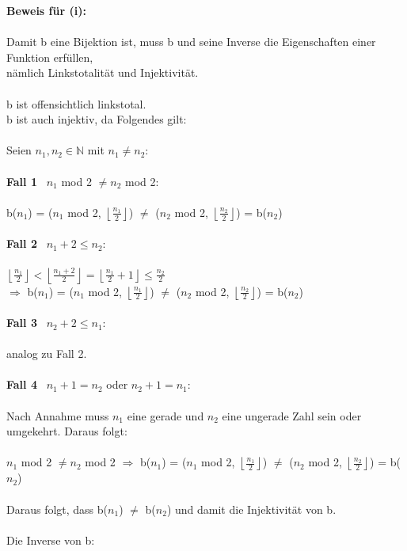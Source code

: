 \documentclass[a4paper,10pt]{article}
\newcommand{\rf}{\right\rfloor}
\newcommand{\lf}{\left\lfloor}
\newcommand{\N}{\mathbb{N}}
\begin{document}
\textbf{Beweis für (i):} \\
\\
Damit b eine Bijektion ist, muss b und seine Inverse die Eigenschaften einer Funktion erfüllen, \\
nämlich Linkstotalität und Injektivität. \\
\\
b ist offensichtlich linkstotal.\\
b ist auch injektiv, da Folgendes gilt: \\
\\
Seien $n_1,n_2 \in \N$ mit $n_1 \neq n_2$: \\
\\
\textbf{Fall 1}~ $n_1$ mod 2 $\neq n_2$ mod 2: \\
\\
b($n_1$) = ($n_1$ mod 2, $\lf \frac{n_1}{2} \rf$) $\neq$ ($n_2$ mod 2, $\lf \frac{n_2}{2} \rf$) = b($n_2$)\\
\\
\textbf{Fall 2}~ $n_1 + 2 \leq n_2$: \\
\\
$\lf \frac{n_1}{2} \rf < \lf \frac{n_1 + 2}{2} \rf = \lf \frac{n_1}{2} + 1 \rf \leq \frac{n_2}{2}$ \\  
$\Rightarrow$ b($n_1$) = ($n_1$ mod 2, $\lf \frac{n_1}{2} \rf$) $\neq$ ($n_2$ mod 2, $\lf \frac{n_2}{2} \rf$) = b($n_2$) \\
\\
\textbf{Fall 3}~ $n_2 + 2 \leq n_1$: \\
\\
analog zu Fall 2. \\
\\
\textbf{Fall 4}~ $n_1 + 1 = n_2$ oder $n_2 + 1 = n_1$: \\
\\
Nach Annahme muss $n_1$ eine gerade und $n_2$ eine ungerade Zahl sein oder \\
umgekehrt. Daraus folgt:\\
\\
$n_1$ mod 2 $\neq n_2$ mod 2 $\Rightarrow$ 
b($n_1$) = ($n_1$ mod 2, $\lf \frac{n_1}{2} \rf$) $\neq$ ($n_2$ mod 2, $\lf \frac{n_2}{2} \rf$) = b($n_2$)\\
\\
Daraus folgt, dass b($n_1$) $\neq$ b($n_2$) und damit die Injektivität von b.
\\
\\
Die Inverse von b: \\
\\
\end{document}
